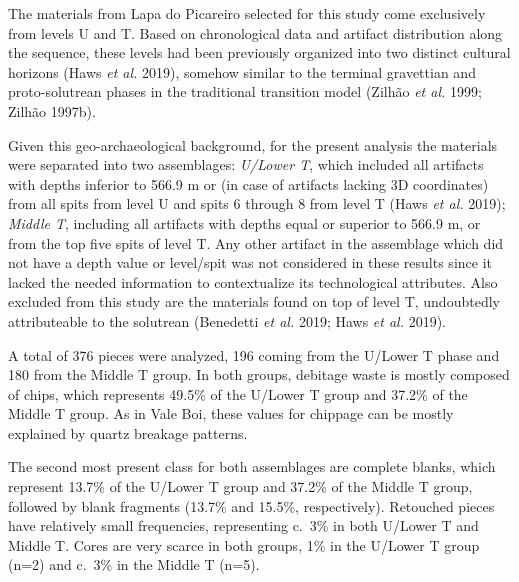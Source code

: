 \documentclass[12pt,twoside]{reedthesis}
\begin{document}
The materials from Lapa do Picareiro selected for this study come exclusively from levels U and T. Based on chronological data and artifact distribution along the sequence, these levels had been previously organized into two distinct cultural horizons (Haws \emph{et al.} 2019), somehow similar to the terminal gravettian and proto-solutrean phases in the traditional transition model (Zilhão \emph{et al.} 1999; Zilhão 1997b).

Given this geo-archaeological background, for the present analysis the materials were separated into two assemblages: \emph{U/Lower T}, which included all artifacts with depths inferior to 566.9 m or (in case of artifacts lacking 3D coordinates) from all spits from level U and spits 6 through 8 from level T (Haws \emph{et al.} 2019); \emph{Middle T}, including all artifacts with depths equal or superior to 566.9 m, or from the top five spits of level T. Any other artifact in the assemblage which did not have a depth value or level/spit was not considered in these results since it lacked the needed information to contextualize its technological attributes. Also excluded from this study are the materials found on top of level T, undoubtedly attributeable to the solutrean (Benedetti \emph{et al.} 2019; Haws \emph{et al.} 2019).

A total of 376 pieces were analyzed, 196 coming from the U/Lower T phase and 180 from the Middle T group. In both groups, debitage waste is mostly composed of chips, which represents 49.5\% of the U/Lower T group and 37.2\% of the Middle T group. As in Vale Boi, these values for chippage can be mostly explained by quartz breakage patterns.

The second most present class for both assemblages are complete blanks, which represent 13.7\% of the U/Lower T group and 37.2\% of the Middle T group, followed by blank fragments (13.7\% and 15.5\%, respectively). Retouched pieces have relatively small frequencies, representing c.~3\% in both U/Lower T and Middle T. Cores are very scarce in both groups, 1\% in the U/Lower T group (n=2) and c.~3\% in the Middle T (n=5).

~
\end{document}
